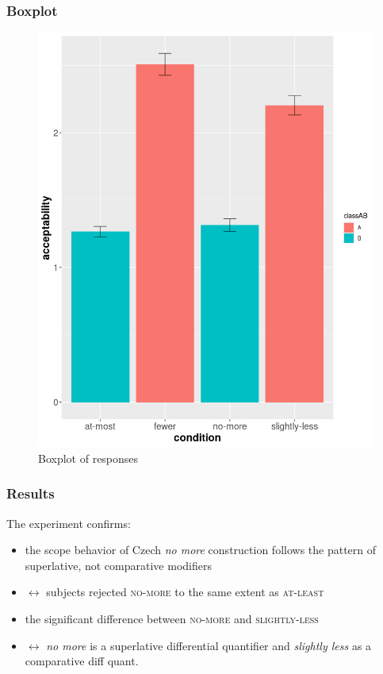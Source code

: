 \documentclass[10pt
]{beamer}
\newcommand{\cond}[1]{\textsc{#1}}
\begin{document}
\begin{frame}
  \frametitle{Boxplot}

\begin{figure}[htbp]
  \centering
  \includegraphics[scale=0.3]{plot_zoom_png.png}
  \caption{Boxplot of responses}
  \label{fig:boxplot}
\end{figure}
  

\end{frame}

\begin{frame}
  \frametitle{Results}

The experiment confirms:

\begin{itemize}
  \item the scope behavior of Czech \textit{no more} construction follows the pattern of superlative, not comparative modifiers
  \item $\leftrightarrow$ subjects rejected \cond{no-more} to the same extent as \cond{at-least}
  \item the significant difference between \cond{no-more} and \cond{slightly-less}
  \item $\leftrightarrow$ \textit{no more} is a superlative differential quantifier and \textit{slightly less} as a comparative diff quant.
\end{itemize}

\end{frame}
\end{document}
